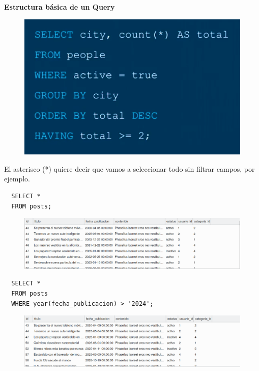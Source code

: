\documentclass{article}
\begin{document}
\textbf{Estructura básica de un Query}
\begin{figure}[h!]
  \centering
  \includegraphics[scale=0.55]{./Pictures/078_query.png}
\end{figure}

El asterisco (*) quiere decir que vamos a seleccionar todo sin filtrar campos, por ejemplo.

\begin{verbatim}
  SELECT *
  FROM posts;
\end{verbatim}
\begin{figure}[h!]
  \centering
  \includegraphics[scale=0.55]{./Pictures/079_select_year.png}
\end{figure}

\begin{verbatim}
  SELECT *
  FROM posts
  WHERE year(fecha_publicacion) > '2024';
\end{verbatim}

\begin{figure}[h!]
  \centering
  \includegraphics[scale=0.55]{./Pictures/079_select_ast.png}
\end{figure}
\end{document}
